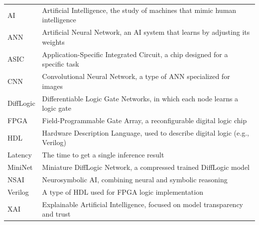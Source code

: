 \singlespacing
\begin{tabular}{l p{5in}}
AI & Artificial Intelligence, the study of machines that mimic human intelligence\\[0.5em]
ANN & Artificial Neural Network, an AI system that learns by adjusting its weights\\[0.5em]
ASIC & Application-Specific Integrated Circuit, a chip designed for a specific task\\[0.5em]
CNN & Convolutional Neural Network, a type of ANN specialized for images\\[0.5em]
DiffLogic & Differentiable Logic Gate Networks, in which each node learns a logic gate\\[0.5em]
FPGA & Field-Programmable Gate Array, a reconfigurable digital logic chip\\[0.5em]
HDL & Hardware Description Language, used to describe digital logic (e.g., Verilog)\\[0.5em]
Latency & The time to get a single inference result\\[0.5em]
MiniNet & Miniature DiffLogic Network, a compressed trained DiffLogic model\\[0.5em]
NSAI & Neurosymbolic AI, combining neural and symbolic reasoning\\[0.5em]
Verilog & A type of HDL used for FPGA logic implementation\\[0.5em]
XAI & Explainable Artificial Intelligence, focused on model transparency and trust\\[0.5em]
\end{tabular}
\doublespacing
